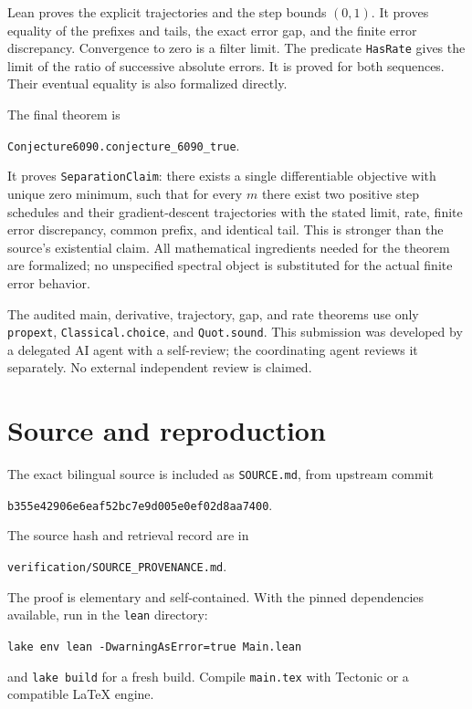 \documentclass[11pt]{article}
\begin{document}
Lean proves the explicit trajectories and the step bounds $(0,1)$.
It proves equality of the prefixes and tails, the exact error gap,
and the finite error discrepancy. Convergence to zero is a filter
limit. The predicate \texttt{HasRate} gives the limit of the ratio of
successive absolute errors. It is proved for both sequences.
Their eventual equality is also formalized directly.

The final theorem is
\begin{center}\texttt{Conjecture6090.conjecture\_6090\_true}.\end{center}
It proves \texttt{SeparationClaim}: there exists a single differentiable
objective with unique zero minimum, such that for every $m$ there exist
two positive step schedules and their gradient-descent trajectories
with the stated limit, rate, finite error discrepancy, common prefix,
and identical tail. This is stronger than the source's existential
claim. All mathematical ingredients needed for the theorem are
formalized; no unspecified spectral object is substituted for the
actual finite error behavior.

The audited main, derivative, trajectory, gap, and rate theorems use
only \texttt{propext}, \texttt{Classical.choice}, and \texttt{Quot.sound}.
This submission was developed by a delegated AI agent with a
self-review; the coordinating agent reviews it separately. No
external independent review is claimed.

\section*{Source and reproduction}
The exact bilingual source is included as \texttt{SOURCE.md}, from
upstream commit
\begin{center}\texttt{b355e42906e6eaf52bc7e9d005e0ef02d8aa7400}.\end{center}
The source hash and retrieval record are in
\begin{center}\texttt{verification/SOURCE\_PROVENANCE.md}.\end{center}
The proof is elementary and self-contained. With the pinned
dependencies available, run in the \texttt{lean} directory:
\begin{center}\texttt{lake env lean -DwarningAsError=true Main.lean}\end{center}
and \texttt{lake build} for a fresh build. Compile \texttt{main.tex}
with Tectonic or a compatible LaTeX engine.
\end{document}
